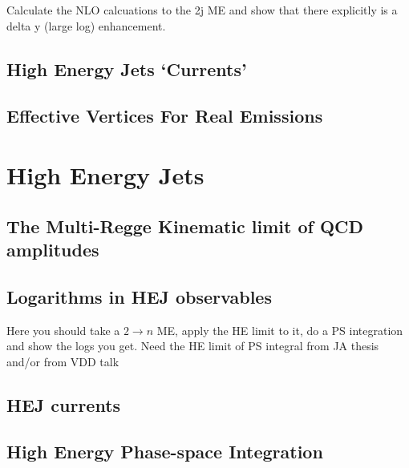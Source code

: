 		Calculate the NLO calcuations to the 2j ME and show that there explicitly is a delta y (large log) enhancement.

	\subsection{High Energy Jets `Currents'}
	\label{sub:currents}

	\subsection{Effective Vertices For Real Emissions}
	\label{sub:effective_vertices_for_real_emissions}

\section{High Energy Jets}
\label{sec:section_name}

	\subsection{The Multi-Regge Kinematic limit of QCD amplitudes}
	\label{sub:subsection_name}

	\subsection{Logarithms in HEJ observables}
	\label{sub:subsection_name}

		Here you should take a $2\rightarrow n$ ME, apply the HE limit to it, do a PS integration and show the logs you get.  Need the HE limit of PS integral from JA thesis and/or from VDD talk

	\subsection{HEJ currents}
	\label{sub:currents}

	\subsection{High Energy Phase-space Integration}
	\label{sub:HEPhaseSpace}

